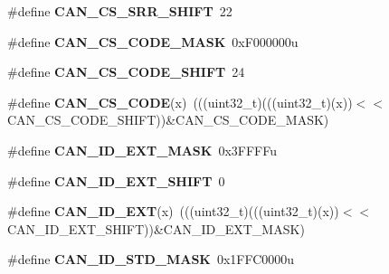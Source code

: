 \begin{DoxyCompactItemize}
\item 
\#define {\bfseries C\+A\+N\+\_\+\+C\+S\+\_\+\+S\+R\+R\+\_\+\+S\+H\+I\+FT}~22\hypertarget{group__CAN__Register__Masks_ga77681ba56144cadb15bce536a1fd016d}{}\label{group__CAN__Register__Masks_ga77681ba56144cadb15bce536a1fd016d}

\item 
\#define {\bfseries C\+A\+N\+\_\+\+C\+S\+\_\+\+C\+O\+D\+E\+\_\+\+M\+A\+SK}~0x\+F000000u\hypertarget{group__CAN__Register__Masks_gadff04787b30174d22d7955037c850b7c}{}\label{group__CAN__Register__Masks_gadff04787b30174d22d7955037c850b7c}

\item 
\#define {\bfseries C\+A\+N\+\_\+\+C\+S\+\_\+\+C\+O\+D\+E\+\_\+\+S\+H\+I\+FT}~24\hypertarget{group__CAN__Register__Masks_ga58e7e6f814f9a6f5fa03974e3f4d7e34}{}\label{group__CAN__Register__Masks_ga58e7e6f814f9a6f5fa03974e3f4d7e34}

\item 
\#define {\bfseries C\+A\+N\+\_\+\+C\+S\+\_\+\+C\+O\+DE}(x)~(((uint32\+\_\+t)(((uint32\+\_\+t)(x))$<$$<$C\+A\+N\+\_\+\+C\+S\+\_\+\+C\+O\+D\+E\+\_\+\+S\+H\+I\+FT))\&C\+A\+N\+\_\+\+C\+S\+\_\+\+C\+O\+D\+E\+\_\+\+M\+A\+SK)\hypertarget{group__CAN__Register__Masks_gadb905f9c1ab532c48d22258796f10a39}{}\label{group__CAN__Register__Masks_gadb905f9c1ab532c48d22258796f10a39}

\item 
\#define {\bfseries C\+A\+N\+\_\+\+I\+D\+\_\+\+E\+X\+T\+\_\+\+M\+A\+SK}~0x3\+F\+F\+F\+Fu\hypertarget{group__CAN__Register__Masks_gacd238d5b88bd71a60ff7c00da7427be7}{}\label{group__CAN__Register__Masks_gacd238d5b88bd71a60ff7c00da7427be7}

\item 
\#define {\bfseries C\+A\+N\+\_\+\+I\+D\+\_\+\+E\+X\+T\+\_\+\+S\+H\+I\+FT}~0\hypertarget{group__CAN__Register__Masks_gadd4a0522a5d856f631a2812cc8fe909c}{}\label{group__CAN__Register__Masks_gadd4a0522a5d856f631a2812cc8fe909c}

\item 
\#define {\bfseries C\+A\+N\+\_\+\+I\+D\+\_\+\+E\+XT}(x)~(((uint32\+\_\+t)(((uint32\+\_\+t)(x))$<$$<$C\+A\+N\+\_\+\+I\+D\+\_\+\+E\+X\+T\+\_\+\+S\+H\+I\+FT))\&C\+A\+N\+\_\+\+I\+D\+\_\+\+E\+X\+T\+\_\+\+M\+A\+SK)\hypertarget{group__CAN__Register__Masks_gaa1bc82610ef65d7579d51e493537e226}{}\label{group__CAN__Register__Masks_gaa1bc82610ef65d7579d51e493537e226}

\item 
\#define {\bfseries C\+A\+N\+\_\+\+I\+D\+\_\+\+S\+T\+D\+\_\+\+M\+A\+SK}~0x1\+F\+F\+C0000u\hypertarget{group__CAN__Register__Masks_ga35a257f1f6dd8ee576becf1f05e995c2}{}\label{group__CAN__Register__Masks_ga35a257f1f6dd8ee576becf1f05e995c2}


\end{DoxyCompactItemize}
